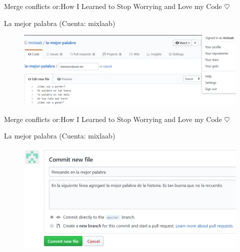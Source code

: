 \documentclass[10pt]{beamer}
\begin{document}
\begin{frame}{Merge conflicts or:}{How I Learned to Stop Worrying and Love my Code $\heartsuit$}

\begin{block}{La mejor palabra (Cuenta: mixlaab)}

\begin{figure}[h!]
\centering
\includegraphics [scale=0.25]{bestwordever}
\label{fig:issues}
\end{figure}
    
\end{block}

\end{frame}

\begin{frame}{Merge conflicts or:}{How I Learned to Stop Worrying and Love my Code $\heartsuit$}

\begin{block}{La mejor palabra (Cuenta: mixlaab)}

\begin{figure}[h!]
\centering
\includegraphics [scale=0.3]{bestwordever2}
\label{fig:issues}
\end{figure}
    
\end{block}

\end{frame}
\end{document}
